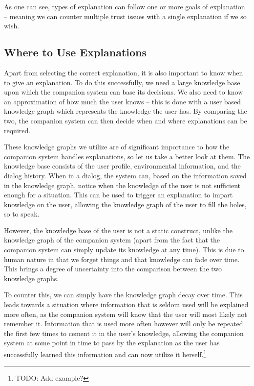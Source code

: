 \documentclass[a4paper]{article}
\begin{document}
As one can see, types of explanation can follow one or more goals of explanation – meaning we can counter multiple trust issues with a single explanation if we so wish.

\subsection{Where to Use Explanations}

Apart from selecting the correct explanation, it is also important to know when to give an explanation. To do this successfully, we need a large knowledge base upon which the companion system can base its decisions. We also need to know an approximation of how much the user knows – this is done with a user based knowledge graph which represents the knowledge the user has. By comparing the two, the companion system can then decide when and where explanations can be required.

These knowledge graphs we utilize are of significant importance to how the companion system handles explanations, so let us take a better look at them. The knowledge base consists of the user profile, environmental information, and the dialog history. When in a dialog, the system can, based on the information saved in the knowledge graph, notice when the knowledge of the user is not sufficient enough for a situation. This can be used to trigger an explanation to impart knowledge on the user, allowing the knowledge graph of the user to fill the holes, so to speak.

However, the knowledge base of the user is not a static construct, unlike the knowledge graph of the companion system (apart from the fact that the companion system can simply update its knowledge at any time). This is due to human nature in that we forget things and that knowledge can fade over time. This brings a degree of uncertainty into the comparison between the two knowledge graphs.

To counter this, we can simply have the knowledge graph decay over time. This leads towards a situation where information that is seldom used will be explained more often, as the companion system will know that the user will most likely not remember it. Information that is used more often however will only be repeated the first few times to cement it in the user's knowledge, allowing the companion system at some point in time to pass by the explanation as the user has successfully learned this information and can now utilize it herself.\footnote{TODO: Add example?}
\end{document}
